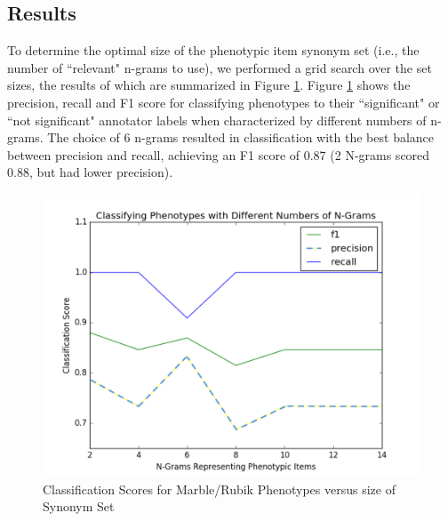 \documentclass{sig-alternate-05-2015}
\begin{document}

\subsection{Results}
To determine the optimal size of the phenotypic item synonym set (i.e., the number of ``relevant" n-grams to use), we performed a grid search over the set sizes, the results of which are summarized in Figure \ref{fig:classificationVarNG}.
Figure \ref{fig:classificationVarNG} shows the precision, recall and F1 score for classifying phenotypes to their ``significant" or ``not significant" annotator labels when characterized by different numbers of n-grams. 
The choice of 6 n-grams resulted in classification with the best balance between precision and recall, achieving an F1 score of 0.87 (2 N-grams scored 0.88, but had lower precision).

\begin{figure} [t]
\centering
\includegraphics[width=\linewidth] {classificationWithVariableNG_edit.png}
\caption{Classification Scores for Marble/Rubik Phenotypes versus size of Synonym Set}
\label{fig:classificationVarNG}
\end{figure}
\end{document}
